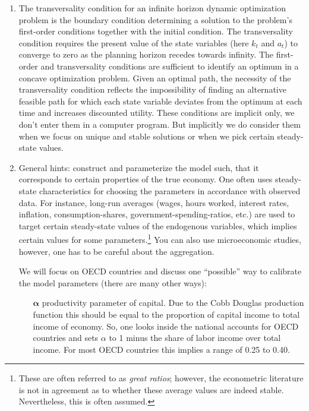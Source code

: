 \begin{enumerate}
\item
The transversality condition for an infinite horizon dynamic optimization problem is the boundary condition
  determining a solution to the problem's first-order conditions together with the initial condition.
The transversality condition requires the present value of the state variables (here \(k_t\) and \(a_t\))
  to converge to zero as the planning horizon recedes towards infinity.
The first-order and transversality conditions are sufficient to identify an optimum in a concave optimization problem.
Given an optimal path, the necessity of the transversality condition reflects the impossibility of finding an alternative feasible path
  for which each state variable deviates from the optimum at each time and increases discounted utility.
These conditions are implicit only, we don't enter them in a computer program.
But implicitly we do consider them when we focus on unique and stable solutions or when we pick certain steady-state values.
	
\item
General hints: construct and parameterize the model such, that it corresponds to certain properties of the true economy.
One often uses steady-state characteristics for choosing the parameters in accordance with observed data.
For instance, long-run averages (wages, hours worked, interest rates, inflation, consumption-shares, government-spending-ratios, etc.) are used 
  to target certain steady-state values of the endogenous variables,
  which implies certain values for some parameters.\footnote{%
  These are often referred to as \emph{great ratios};
    however, the econometric literature is not in agreement as to whether these average values are indeed stable.
  Nevertheless, this is often assumed.
}
You can also use microeconomic studies, however, one has to be careful about the aggregation.
			
We will focus on OECD countries and discuss one \enquote{possible} way to calibrate the model parameters (there are many other ways):

\begin{itemize}

\item[\(\boldsymbol{\alpha}\)] productivity parameter of capital.
Due to the Cobb Douglas production function this should be equal to the proportion of capital income to total income of economy.
So, one looks inside the national accounts for OECD countries and sets \(\alpha \) to 1 minus the share of labor income over total income.
For most OECD countries this implies a range of 0.25 to 0.40.


\end{itemize}
\end{enumerate}
